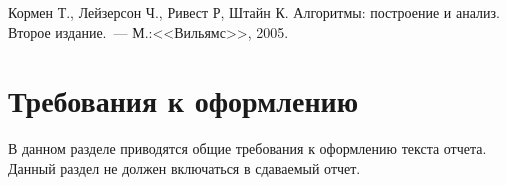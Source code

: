 \documentclass[a4paper,12pt,titlepage,draft]{article}
\begin{document}
\newpage
\begin{raggedright}
\begin{thebibliography}{99}
 Кормен Т., Лейзерсон Ч., Ривест Р, Штайн К.
    Алгоритмы: построение и анализ.
    Второе издание.~--- М.:<<Вильямс>>, 2005.
\end{thebibliography}
\end{raggedright}

\newpage

\section*{Требования к оформлению}

В данном разделе приводятся общие требования к оформлению текста отчета.
Данный раздел не должен включаться в сдаваемый отчет.
\end{document}
